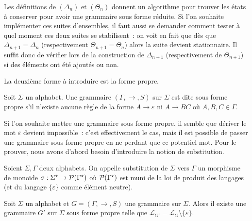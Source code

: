 \begin{remark}
  Les définitions de $(\Delta_n)$ et $(\Theta_n)$ donnent un algorithme pour
  trouver les états à conserver pour avoir une grammaire sous forme réduite. Si
  l'on souhaite implémenter ces suites d'ensembles, il faut aussi se demander
  comment tester à quel moment ces deux suites se stabilisent~: on voit en fait
  que dès que $\Delta_{n+1} = \Delta_n$ (respectivement $\Theta_{n+1}=\Theta_n$)
  alors la suite devient stationnaire. Il suffit donc de vérifier lors de la
  construction de $\Delta_{n+1}$ (respectivement de $\Theta_{n+1}$) si des
  éléments ont été ajoutés ou non.
\end{remark}

La deuxième forme à introduire est la forme propre.

\begin{definition}
  Soit $\Sigma$ un alphabet. Une grammaire $(\Gamma,\to,S)$ sur $\Sigma$ est
  dite sous forme propre s'il n'existe aucune règle de la forme
  $A \to \varepsilon$ ni $A \to BC$ où $A,B,C\in \Gamma$.
\end{definition}

Si l'on souhaite mettre une grammaire sous forme propre, il semble que dériver
le mot $\varepsilon$ devient impossible~: c'est effectivement le cas, mais il
est possible de passer une grammaire sous forme propre en ne perdant que ce
potentiel mot. Pour le prouver, nous avons d'abord besoin d'introduire la notion
de substitution.

\begin{definition}[Substitution]
  Soient $\Sigma, \Gamma$ deux alphabets. On appelle substitution de $\Sigma$
  vers $\Gamma$ un morphisme de monoïde
  $\sigma : \Sigma^\star \to \mathcal{P} (\Gamma^\star)$ où $\mathcal{P}(\Gamma^\star)$
  est muni de la loi de produit des langages (et du langage $\{\varepsilon\}$
  comme élément neutre).
\end{definition}

\begin{proposition}
  Soit $\Sigma$ un alphabet et $G = (\Gamma,\to,S)$ une grammaire sur $\Sigma$.
  Alors il existe une grammaire $G'$ sur $\Sigma$ sous forme propre telle que
  $\mathcal L_{G'} = \mathcal L_G \setminus \{\varepsilon\}$.
\end{proposition}

